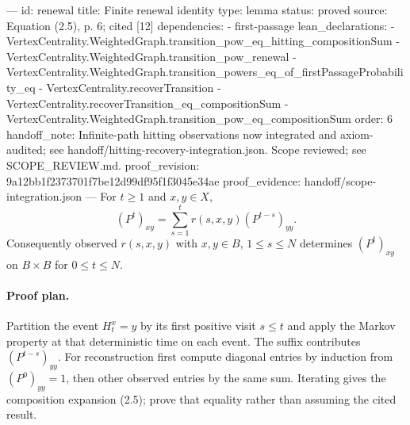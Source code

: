---
id: renewal
title: Finite renewal identity
type: lemma
status: proved
source: Equation (2.5), p. 6; cited [12]
dependencies:
- first-passage
lean_declarations:
- VertexCentrality.WeightedGraph.transition_pow_eq_hitting_compositionSum
- VertexCentrality.WeightedGraph.transition_pow_renewal
- VertexCentrality.WeightedGraph.transition_powers_eq_of_firstPassageProbability_eq
- VertexCentrality.recoverTransition
- VertexCentrality.recoverTransition_eq_compositionSum
- VertexCentrality.WeightedGraph.transition_pow_eq_compositionSum
order: 6
handoff_note: Infinite-path hitting observations now integrated and axiom-audited; see handoff/hitting-recovery-integration.json. Scope reviewed; see SCOPE_REVIEW.md.
proof_revision: 9a12bb1f2373701f7be12d99df95f1f3045e34ae
proof_evidence: handoff/scope-integration.json
---
For $t\geq1$ and $x,y\in X$, \[(P^t)_{xy}=\sum_{s=1}^t r(s,x,y)(P^{t-s})_{yy}.\] Consequently observed $r(s,x,y)$ with $x,y\in B$, $1\leq s\leq N$ determines $(P^t)_{xy}$ on $B\times B$ for $0\leq t\leq N$.

\paragraph{Proof plan.}
Partition the event $H_t^x=y$ by its first positive visit $s\leq t$ and apply the Markov property at that deterministic time on each event. The suffix contributes $(P^{t-s})_{yy}$. For reconstruction first compute diagonal entries by induction from $(P^0)_{yy}=1$, then other observed entries by the same sum. Iterating gives the composition expansion (2.5); prove that equality rather than assuming the cited result.
